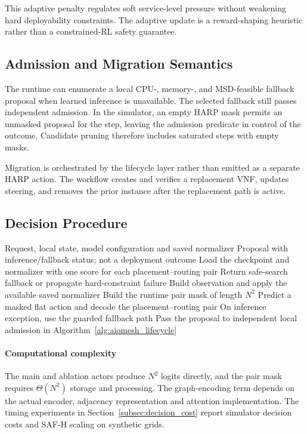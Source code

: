 \documentclass[final,5p]{elsarticle}
\newcommand{\rev}[1]{\textcolor{revisiongreen}{#1}}
\let\newrev\rev
\begin{document}
This adaptive penalty regulates soft service-level pressure without weakening hard deployability constraints. \rev{The adaptive update is a reward-shaping heuristic rather than a constrained-RL safety guarantee. }

\subsection{Admission and Migration Semantics}
\label{subsec:harp_admission}
\newrev{The runtime can enumerate a local CPU-, memory-, and MSD-feasible fallback proposal when learned inference is unavailable. The selected fallback still passes independent admission. In the simulator, an empty HARP mask permits an unmasked proposal for the step, leaving the admission predicate in control of the outcome. Candidate pruning therefore includes saturated steps with empty masks.}

Migration is orchestrated by the lifecycle layer rather than emitted as a separate HARP action. The workflow creates and verifies a replacement VNF, updates steering, and removes the prior instance after the replacement path is active.

\subsection{Decision Procedure}
\label{subsec:harp_decision_procedure}
\begin{algorithm}[t]
\caption{Runtime inference path for a flat N²-action policy checkpoint}
\label{alg:harp_decision}
\small
\begin{algorithmic}[1]
\Require Request, local state, model configuration and saved normalizer
\Ensure Proposal with inference/fallback status; not a deployment outcome
\State \newrev{Load the checkpoint and normalizer with one score for each placement--routing pair}
    \State Return safe-search fallback or propagate hard-constraint failure
\EndIf
\State Build observation and apply the available saved normalizer
\State Build the runtime pair mask of length \(N^2\)
\State Predict a masked flat action and decode the placement--routing pair
\State On inference exception, use the guarded fallback path
\State Pass the proposal to independent local admission in Algorithm~\ref{alg:aiomesh_lifecycle}
\end{algorithmic}
\end{algorithm}

\paragraph{Computational complexity}\label{subsec:harp_complexity}
\newrev{The main and ablation actors produce \(N^2\) logits directly, and the pair mask requires \(\Theta(N^2)\) storage and processing. The graph-encoding term depends on the actual encoder, adjacency representation and attention implementation. The timing experiments in Section~\ref{subsec:decision_cost} report simulator decision costs and SAF-H scaling on synthetic grids.}
\end{document}
